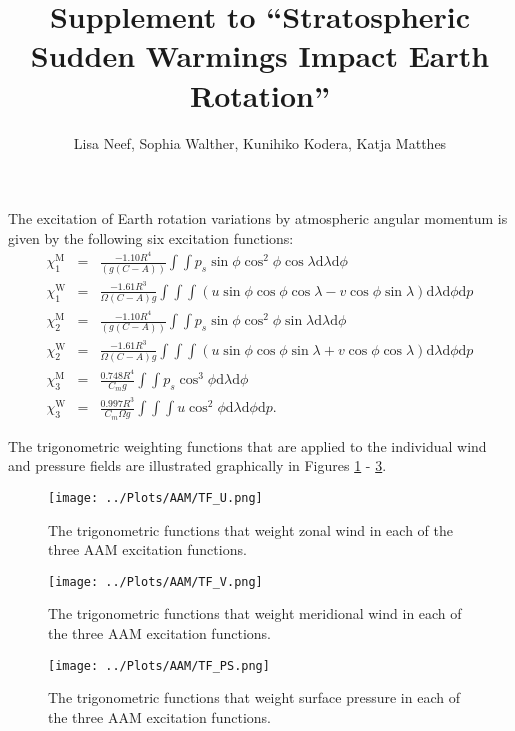 \documentclass[a4paper,10pt]{article}
\title{Supplement to ``Stratospheric Sudden Warmings Impact Earth Rotation''}
\author{Lisa Neef, Sophia Walther, Kunihiko Kodera, Katja Matthes}
\begin{document}
\maketitle

The excitation of Earth rotation variations by atmospheric angular momentum is given by the following six excitation functions:
\begin{eqnarray} 
%
\chi^{\text{M}}_1 &=&
\frac{ -1.10R^4}{(g(C-A))}
\int \int
p_s \sin \phi \cos^2 \phi \cos \lambda
\text{d}\lambda \text{d}\phi
\label{eq:X1m}
\\
\chi^{\text{W}}_1 &=&
\frac{-1.61 R^3}{\Omega (C-A)g}
\int \int \int
(u \sin \phi \cos \phi \cos \lambda -
v \cos \phi \sin \lambda)
\text{d}\lambda \text{d}\phi \text{d}p
\label{eq:X1w}
\\
\chi^{\text{M}}_2 &=&
\frac{ -1.10 R^4}{(g(C-A))}
\int \int
p_s \sin \phi \cos^2 \phi \sin \lambda
\text{d}\lambda \text{d}\phi
\label{eq:X2m}
\\
\chi^{\text{W}}_2 &=&
\frac{-1.61 R^3}{\Omega (C-A)g}
\int \int \int
(u \sin \phi \cos \phi \sin \lambda +
v \cos \phi \cos \lambda)
\text{d}\lambda \text{d}\phi \text{d}p
\label{eq:X2w}
\\
\chi^{\text{M}}_3 &=&
\frac{0.748 R^4}{C_m g}
\int \int
p_s \cos^3 \phi
\text{d}\lambda \text{d}\phi
\label{eq:X3m}
\\
\chi^{\text{W}}_3 &=&
\frac{0.997 R^3}{C_m \Omega g}
\int \int \int
u \cos^2 \phi
\text{d}\lambda \text{d}\phi \text{d}p.
\label{eq:X3w}
%
\end{eqnarray}


The trigonometric weighting functions that are applied to the individual wind and pressure fields are illustrated graphically in Figures \ref{fig:TF_U} - \ref{fig:TF_PS}.


\begin{figure} 
\texttt{[image: ../Plots/AAM/TF\_U.png]}
   \caption{The trigonometric functions that weight zonal wind  in each of the three AAM excitation functions.}
   \label{fig:TF_U}
\end{figure}

\begin{figure} 
\texttt{[image: ../Plots/AAM/TF\_V.png]}
   \caption{The trigonometric functions that weight meridional wind  in each of the three AAM excitation functions.}
   \label{fig:TF_V}
\end{figure}

\begin{figure} 
\texttt{[image: ../Plots/AAM/TF\_PS.png]}
   \caption{The trigonometric functions that weight surface pressure  in each of the three AAM excitation functions.}
   \label{fig:TF_PS}
\end{figure}
\end{document}
